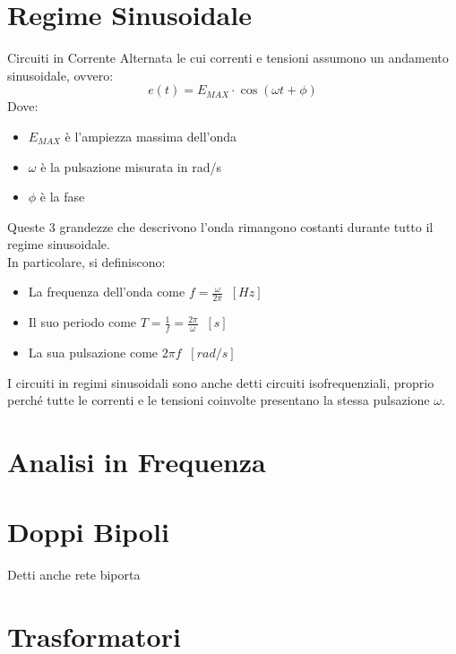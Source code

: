 \documentclass{article}
\begin{document}
	\section{Regime Sinusoidale}
	Circuiti in Corrente Alternata le cui correnti e tensioni assumono un andamento sinusoidale, ovvero:
	\[e(t) = E_{MAX} \cdot \cos (\omega t + \phi)\]
	Dove:
	\begin{itemize}
		\item $E_{MAX}$ è l'ampiezza massima dell'onda
		\item $\omega$ è la pulsazione misurata in rad/s
		\item $\phi$ è la fase
	\end{itemize}
	Queste 3 grandezze che descrivono l’onda rimangono costanti durante tutto il regime sinusoidale.\\
	In particolare, si definiscono:
	\begin{itemize}
		\item La frequenza dell’onda come $f = \frac{\omega}{2 \pi} \;\; [Hz]$
		\item Il suo periodo come $T = \frac{1}{f} = \frac{2 \pi}{\omega} \;\; [s]$
		\item La sua pulsazione come $2 \pi f \;\; [rad/s]$
	\end{itemize}
	I circuiti in regimi sinusoidali sono anche detti circuiti isofrequenziali, proprio perché tutte le correnti e le tensioni coinvolte presentano la stessa pulsazione $\omega$.
	
	
	\section{Analisi in Frequenza}
	
	
	\section{Doppi Bipoli}
	Detti anche rete biporta
	
	
	\section{Trasformatori}
	
	
\end{document}
